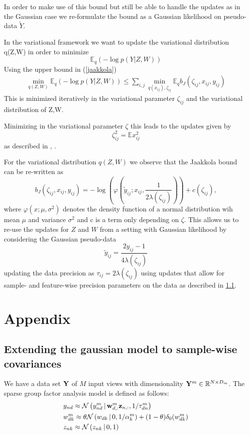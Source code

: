 \documentclass[10pt, a4paper,openany]{paper}
\begin{document}
In order to make use of this bound but still be able to handle the updates as in the Gaussian case we re-formulate the bound as a Gaussian likelihood on pseudo-data $\tilde{Y}$.

In the variational framework we want to update the variational distribution q(Z,W) in order to minimize 
\begin{equation}
	\mathbb{E}_q\left(-\log p(Y|Z,W)\right)
\end{equation}
Using the upper bound in (\ref{jaakkola})
\begin{align}
	\min_{q(Z,W)}\mathbb{E}_q\left(-\log p(Y|Z,W)\right) \leq \sum_{i,j} \min_{q(x_{ij}), \zeta_{ij}} \mathbb{E}_q b_J(\zeta_{ij}, x_{ij},y_{ij} )
\end{align}
This is minimized iteratively in the variational parameter $\zeta_{ij}$ and the variational distribution of Z,W.


Minimizing in the variational parameter $\zeta$ this leads to the updates given by
\begin{equation}
\zeta_{ij}^2 = \mathbb{E} x_{ij}^2
\end{equation}
as described in \cite[]{Jaakkola}, \cite[]{bishop2006pattern}.

For the variational distribution $q(Z,W)$ we observe that the Jaakkola bound can be re-written as 
\begin{equation}
	b_J(\zeta_{ij}, x_{ij},y_{ij} ) = -\log\left(\varphi\left(\tilde{y}_{ij}; x_{ij}, \frac{1}{2\lambda(\zeta_{ij})}\right)\right) + c(\zeta_{ij}),
\end{equation}
where $\varphi(x; \mu, \sigma^2)$ denotes the density function of a normal distribution wih mean $\mu$ and variance $\sigma^2$ and c is a term only depending on $\zeta$. This allows us to re-use the updates for $Z$ and $W$ from a setting with Gaussian likelihood by considering the Gaussian pseudo-data 
\begin{equation}
\tilde{y}_{ij}= \frac{2y_{ij}-1}{4 \lambda(\zeta_{ij})}
\end{equation}
 updating the data precision as $\tau_{ij} = 2\lambda(\zeta_{ij})$ using updates that allow for sample- and feature-wise precision parameters on the data as described in \ref{App.Samplewise}.




\section{Appendix}
\subsection{Extending the gaussian model to sample-wise covariances}
\label{App.Samplewise}
We have a data set ${\bf Y}$ of $M$ input views with dimensionality ${\bf Y}^m \in \mathbb{R}^{N \times D_m}$. The sparse group factor analysis model is defined as follows:
\begin{align}
&y_{nd} \approx \mathcal{N}\left(y_{nd}^m \,|\, {\bf w}_{d,:}^m{\bf z}_{n,:},1/\tau_{dn}^m\right) \\
&w_{dk}^m \approx \theta\mathcal{N}\left(w_{dk} \,|\, 0,1/\alpha_k^m\right) + (1-\theta)\delta_0(w_{dk}^m)\\
&z_{nk} \approx \mathcal{N}\left(z_{nk} \,|\, 0,1\right)
\end{align}
\end{document}

